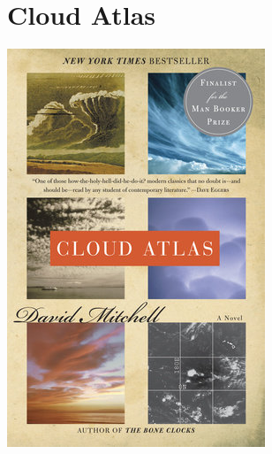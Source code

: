 \documentclass{tufte-handout}
\makeatletter
\newcommand{\varcaption}[2][0pt]{%
  \gsetlength{\@tufte@caption@vertical@offset}{-#1}%
  \gdef\@tufte@stored@varcaption{#2}%
}
\gdef\@tufte@stored@varcaption{} %
\makeatother
\begin{document}
\section*{Cloud Atlas}
\begin{marginfigure}[18\baselineskip]
   \includegraphics[width=\linewidth]{images/cloud_atlas.jpg}
   \varcaption{\href{https://www.penguinrandomhouse.com/books/115430/cloud-atlas-by-david-mitchell/9780812994711/}{Publisher Link}, \href{https://www.amazon.com/Cloud-Atlas-Novel-David-Mitchell/dp/0375507256}{Amazon Link}}
\end{marginfigure}
\end{document}
